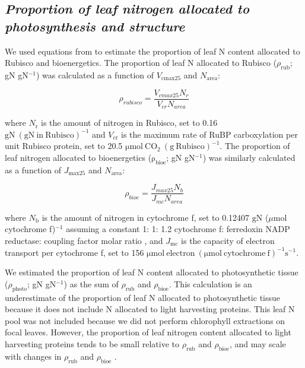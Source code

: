 \subsection{\textit{Proportion of leaf nitrogen allocated to photosynthesis and structure}}
We used equations from  to estimate the proportion of leaf N content allocated to Rubisco and bioenergetics. The proportion of leaf N allocated to Rubisco ($\rho_\mathrm{rub}$; gN gN$^{-1}$) was calculated as a function of $V_\mathrm{cmax25}$ and $N_\mathrm{area}$: 

\begin{equation} \label{eqn_2.9}
    \rho_{rubisco}=\frac{V_{cmax25}N_r}{V_{cr}N_{area}}
\end{equation}

\noindent where $N_\mathrm{r}$ is the amount of nitrogen in Rubisco, set to 0.16 $\mathrm{gN\ (gN\ in\ Rubisco)^{-1}}$ and $V_\mathrm{cr}$ is the maximum rate of RuBP carboxylation per unit Rubisco protein, set to 20.5 $\mathrm{\mu mol\ CO_2\ (g\ Rubisco)^{-1}}$. The proportion of leaf nitrogen allocated to bioenergetics ($\mathrm{\rho_{bioe}}$; gN gN$^{-1}$) was similarly calculated as a function of $J_\mathrm{max25}$ and $N_\mathrm{area}$:

\begin{equation} \label{eqn_2.10}
    \rho_{bioe}=\frac{J_{max25}N_b}{J_{mc}N_{area}}
\end{equation}

\noindent where $N_\mathrm{b}$ is the amount of nitrogen in cytochrome f, set to 0.12407 $\mathrm{gN}$ ($\mu\mathrm{mol}$ cytochrome f)$^{-1}$ assuming a constant 1: 1: 1.2 cytochrome f: ferredoxin NADP reductase: coupling factor molar ratio , and $J_\mathrm{mc}$ is the capacity of electron transport per cytochrome f, set to 156 $\mathrm{\mu mol\ electron\ (\mu mol\ cytochrome\ f)^{-1} s^{-1}}$.

We estimated the proportion of leaf N content allocated to photosynthetic tissue ($\rho_\mathrm{photo}$; gN gN$^{-1}$) as the sum of $\rho_\mathrm{rub}$ and $\rho_\mathrm{bioe}$. This calculation is an underestimate of the proportion of leaf N allocated to photosynthetic tissue because it does not include N allocated to light harvesting proteins. This leaf N pool was not included because we did not perform chlorophyll extractions on focal leaves. However, the proportion of leaf nitrogen content allocated to light harvesting proteins tends to be small relative to $\rho_\mathrm{rub}$ and $\rho_\mathrm{bioe}$, and may scale with changes in $\rho_\mathrm{rub}$ and $\rho_\mathrm{bioe}$ .

